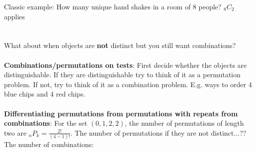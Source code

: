 Classic example:  How many unique hand shakes in a room of 8 people?  ${_8}C_2$ applies \hfill \\
\hfill \\
\hfill \\
What about when objects are \textbf{not} distinct but you still want combinations? \hfill \\
\hfill \\

\textbf{Combinations/permutations on tests}: First decide whether the objects are distinguishable.  If they are distinguishable try to think of it as a permutation problem.  If not, try to think of it as a combination problem.  E.g. ways to order 4 blue chips and 4 red chips.  \hfill \\
\hfill \\

\textbf{Differentiating permutations from permutations with repeats from combinations}:
For the set $(0, 1, 2, 2)$, the number of permutations of length two are ${_n}P_k = \frac{2!}{(4-1)!}$.
The number of permutations if they are not distinct...??
The number of combinations: 
	

  

    
    
    
    
    
    
    
    
    

